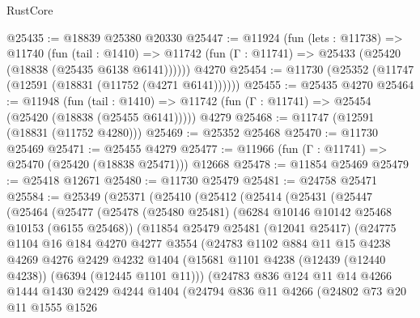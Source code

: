 \begin{lexlean}{RustCore}
\begin{coremodule}
@25435 := @18839 @25380 @20330
@25447 := @11924
    (fun (lets : @11738) =>
    @11740
      (fun (tail : @1410) =>
      @11742 (fun (Γ : @11741) => @25433 (@25420 (@18838 (@25435 @6138 @6141))))))
    @4270
@25454 := @11730 (@25352 (@11747 (@12591 (@18831 (@11752 (@4271 @6141))))))
@25455 := @25435 @4270
@25464 := @11948
    (fun (tail : @1410) => @11742 (fun (Γ : @11741) => @25454 (@25420 (@18838 (@25455 @6141)))))
    @4279
@25468 := @11747 (@12591 (@18831 (@11752 @4280)))
@25469 := @25352 @25468
@25470 := @11730 @25469
@25471 := @25455 @4279
@25477 := @11966 (fun (Γ : @11741) => @25470 (@25420 (@18838 @25471))) @12668
@25478 := @11854 @25469
@25479 := @25418 @12671
@25480 := @11730 @25479
@25481 := @24758 @25471
@25584 := @25349
    (@25371
      (@25410
        (@25412
          (@25414
            (@25431
              (@25447
                (@25464
                  (@25477
                    (@25478
                      (@25480 @25481)
                      (@6284 @10146 @10142 @25468 @10153 (@6155 @25468))
                      (@11854
                        @25479
                        @25481
                        (@12041 @25417)
                        (@24775
                          @1104
                          @16
                          @184
                          @4270
                          @4277
                          @3554
                          (@24783
                            @1102
                            @884
                            @11
                            @15
                            @4238
                            @4269
                            @4276
                            @2429
                            @4232
                            @1404
                            (@15681 @1101 @4238 (@12439 (@12440 @4238)) (@6394 (@12445 @1101 @11)))
                            (@24783
                              @836
                              @124
                              @11
                              @14
                              @4266
                              @1444
                              @1430
                              @2429
                              @4244
                              @1404
                              (@24794
                                @836
                                @11
                                @4266
                                (@24802
                                  @73
                                  @20
                                  @11
                                  @1555
                                  @1526

\end{coremodule}
\end{lexlean}
